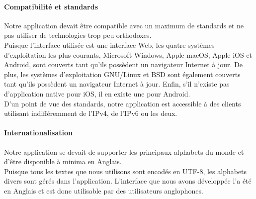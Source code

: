 \paragraph{Compatibilité et standards} Notre application devait être compatible avec un maximum de standards et ne pas utiliser de technologies trop peu orthodoxes.\\
Puisque l'interface utilisée est une interface Web, les quatre systèmes d'exploitation les plus courants, Microsoft Windows, Apple macOS, Apple iOS et Android, sont couverts tant qu'ils possèdent un navigateur Internet à jour. De plus, les systèmes d'exploitation GNU/Linux et BSD sont également couverts tant qu'ils possèdent un navigateur Internet à jour. Enfin, s'il n'existe pas d'application native pour iOS, il en existe une pour Android.\\
D'un point de vue des standards, notre application est accessible à des clients utilisant indifféremment de l'IPv4, de l'IPv6 ou les deux.

\paragraph{Internationalisation} Notre application se devait de supporter les principaux alphabets du monde et d'être disponible à minima en Anglais.\\
Puisque tous les textes que nous utilisons sont encodés en UTF-8, les alphabets divers sont gérés dans l'application. L'interface que nous avons développée l'a été en Anglais et est donc utilisable par des utilisateurs anglophones.
